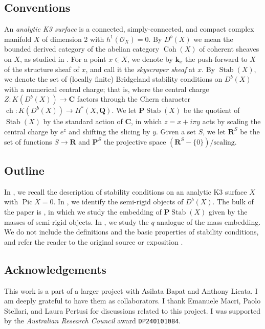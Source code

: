 \documentclass{amsart}
\begin{document}
\subsection{Conventions}
An \emph{analytic K3 surface} is a connected, simply-connected, and compact complex manifold \(X\) of dimension 2 with \(h^1(\mathcal{O}_X) = 0\).
By \(D^b(X)\) we mean the bounded derived category of the abelian category \(\operatorname{Coh}(X)\) of coherent sheaves on \(X\), as studied in \cite{huy.mac.ste:08}.
For a point \(x \in X\), we denote by \(\mathbf{k}_x\) the push-forward to \(X\) of the structure sheaf of \(x\), and call it the \emph{skyscraper sheaf} at \(x\).
By \(\operatorname{Stab}(X)\), we denote the set of (locally finite) Bridgeland stability conditions on \(D^b(X)\) with a numerical central charge; that is, where the central charge \(Z \colon K(D^b(X)) \to \mathbf{C}\) factors through the Chern character \(\operatorname{ch} \colon K(D^b(X)) \to H^{*}(X, \mathbf{Q})\).
We let \(\mathbf{P} \operatorname{Stab}(X)\) be the quotient of \(\operatorname{Stab}(X)\) by the standard action of \(\mathbf{C}\), in which \(z = x + i\pi y\) acts by scaling the central charge by \(e^{z}\) and shifting the slicing by \(y\).
Given a set \(S\), we let \(\mathbf{R}^S\) be the set of functions \(S \to \mathbf{R}\) and \(\mathbf{P}^S\) the projective space \(\left(\mathbf{R}^S - \{0\}\right) / \text{scaling}\).
\subsection{Outline}
In , we recall the description of stability conditions on an analytic K3 surface \(X\) with \(\operatorname{Pic} X = 0\).
In , we identify the semi-rigid objects of \(D^b(X)\).
The bulk of the paper is , in which we study the embedding of \(\mathbf{P} \operatorname{Stab}(X)\) given by the masses of semi-rigid objects.
In , we study the \(q\)-analogue of the mass embedding.
We do not include the definitions and the basic properties of stability conditions, and refer the reader to the original source \cite{bri:07} or exposition \cite{bay:11}.

\subsection{Acknowledgements}
This work is a part of a larger project with Asilata Bapat and Anthony Licata.
I am deeply grateful to have them as collaborators.
I thank Emanuele Macri, Paolo Stellari, and Laura Pertusi for discussions related to this project.
I was supported by the \emph{Australian Research Council} award \texttt{DP240101084}.
\end{document}
